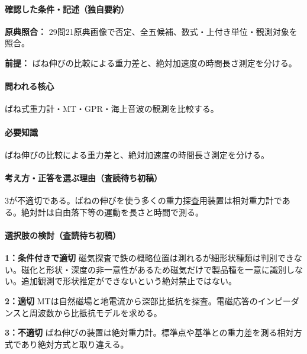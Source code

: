 \paragraph{確認した条件・記述（独自要約）}\mbox{}\par

\noindent\textbf{原典照合：} 29問21原典画像で否定、全五候補、数式・上付き単位・観測対象を照合。\par

\noindent\textbf{前提：} ばね伸びの比較による重力差と、絶対加速度の時間長さ測定を分ける。\par

\paragraph{問われる核心} ばね式重力計・MT・GPR・海上音波の観測を比較する。

\paragraph{必要知識} ばね伸びの比較による重力差と、絶対加速度の時間長さ測定を分ける。

\paragraph{考え方・正答を選ぶ理由（査読待ち初稿）} 3が不適切である。ばねの伸びを使う多くの重力探査用装置は相対重力計である。絶対計は自由落下等の運動を長さと時間で測る。

\paragraph{選択肢の検討（査読待ち初稿）}\mbox{}\par

\noindent\textbf{1：条件付きで適切} 磁気探査で鉄の概略位置は測れるが細形状種類は判別できない。磁化と形状・深度の非一意性があるため磁気だけで製品種を一意に識別しない。追加観測で形状推定ができないという絶対禁止ではない。\par

\noindent\textbf{2：適切} MTは自然磁場と地電流から深部比抵抗を探査。電磁応答のインピーダンスと周波数から比抵抗モデルを求める。\par

\noindent\textbf{3：不適切} ばね伸びの装置は絶対重力計。標準点や基準との重力差を測る相対方式であり絶対方式と取り違える。\par

